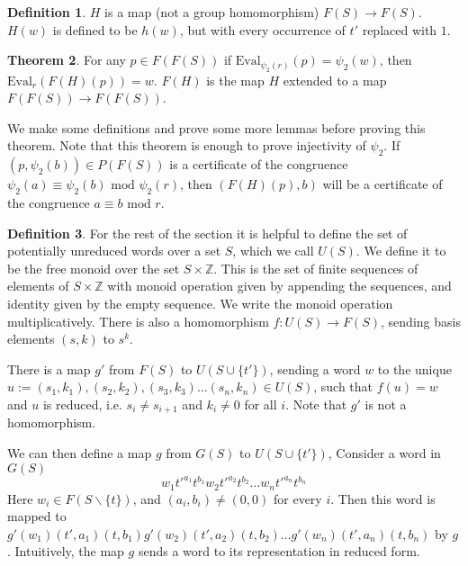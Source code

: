 \documentclass[12pt]{article} %
\theoremstyle{definition}
\newtheorem{thm}{Theorem}[subsubsection]
\theoremstyle{definition}
\theoremstyle{definition}
\theoremstyle{definition}
\newtheorem{defn}[thm]{Definition}
\begin{document}
\begin{defn} \label{PowProof}
  $H$ is a map (not a group homomorphism) $F(S) \to F(S)$. $H(w)$ is defined to be
  $h(w)$, but with every occurrence of $t'$ replaced with $1$.
\end{defn}

\begin{thm}\label{powproof}
  For any $p \in F(F(S))$ if $\text{Eval}_{\psi_2(r)}(p) = \psi_2(w)$,
  then $\text{Eval}_r(F(H)(p)) = w$. $F(H)$ is the map $H$ extended to a map
  $F(F(S)) \to F(F(S))$.
\end{thm}

We make some definitions and prove some more lemmas before proving this theorem.
Note that this theorem is enough to prove injectivity of $\psi_2$.
If $(p, \psi_2(b)) \in P(F(S))$ is a certificate of the congruence
$\psi_2(a) \equiv \psi_2(b) \text{ mod }\psi_2(r)$, then
$(F(H)(p), b)$ will be a certificate of the congruence $a \equiv b \text{ mod } r$.

\begin{defn}
  For the rest of the section it is helpful to define the set of potentially unreduced
  words over a set $S$, which we call $U(S)$.
  We define it to be the free monoid over the set $S \times \mathbb{Z}$.
  This is the set of finite sequences of elements of $S \times \mathbb{Z}$ with monoid operation
  given by appending the sequences, and identity given by the empty sequence. We write
  the monoid operation multiplicatively.
  There is also a homomorphism $f : U(S) \to F(S)$, sending basis elements $(s, k)$ to
  $s^k$.
\end{defn}

There is a map $g'$ from $F(S)$ to $U(S \cup \{t'\})$, sending a word $w$ to the unique
$u := (s_1, k_1), (s_2, k_2), (s_3, k_3) \dots (s_n, k_n) \in U(S)$, such that
$f(u) = w$ and $u$ is reduced, i.e. $s_i \ne s_{i+1}$ and $k_i \ne 0$ for all $i$.
Note that $g'$ is not a homomorphism.

We can then define a map $g$ from $G(S)$ to $U(S \cup \{t'\})$,
Consider a word in $G(S)$
  \begin{equation}
    w_1t'^{a_1}t^{b_1}w_2t'^{a_2}t^{b_2} \dots w_nt'^{a_n}t^{b_n}
  \end{equation}
Here $w_i \in F(S \backslash \{t\})$, and $(a_i, b_i) \ne (0, 0)$ for every $i$.
Then this word is mapped to $g'(w_1)(t', a_1)(t, b_1)g'(w_2)(t', a_2)(t, b_2) \dots
g'(w_n)(t', a_n)(t, b_n)$ by $g$. Intuitively, the map $g$ sends a word to its
representation in reduced form.
\end{document}
